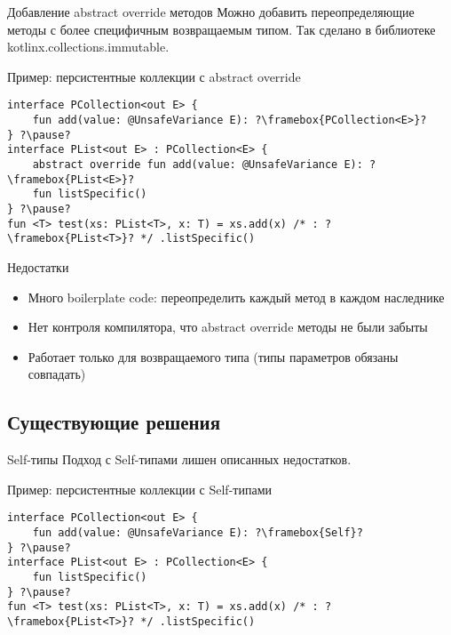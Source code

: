\documentclass[aspectratio=169,usenames,dvipsnames]{beamer}
\begin{document}
    \begin{frame}[fragile]{Добавление abstract override методов}
        Можно добавить переопределяющие методы с более специфичным возвращаемым типом.
        Так сделано в библиотеке kotlinx.collections.immutable.
        \pause
        \begin{block}{Пример: персистентные коллекции с abstract override}
            \begin{verbatim}
interface PCollection<out E> {
    fun add(value: @UnsafeVariance E): ?\framebox{PCollection<E>}?
} ?\pause?
interface PList<out E> : PCollection<E> {
    abstract override fun add(value: @UnsafeVariance E): ?\framebox{PList<E>}?
    fun listSpecific()
} ?\pause?
fun <T> test(xs: PList<T>, x: T) = xs.add(x) /* : ?\framebox{PList<T>}? */ .listSpecific()
            \end{verbatim}
        \end{block}
        \pause
        \begin{block}{Недостатки}
            \begin{itemize}
                \item Много boilerplate code: переопределить каждый метод в каждом наследнике
                \item Нет контроля компилятора, что abstract override методы не были забыты
                \item Работает только для возвращаемого типа (типы параметров обязаны совпадать)
            \end{itemize}
        \end{block}
    \end{frame}

    \subsection{Существующие решения}

    \begin{frame}[fragile]{Self-типы}
        Подход с Self-типами лишен описанных недостатков.
        \begin{block}{Пример: персистентные коллекции с Self-типами}
            \begin{verbatim}
interface PCollection<out E> {
    fun add(value: @UnsafeVariance E): ?\framebox{Self}?
} ?\pause?
interface PList<out E> : PCollection<E> {
    fun listSpecific()
} ?\pause?
fun <T> test(xs: PList<T>, x: T) = xs.add(x) /* : ?\framebox{PList<T>}? */ .listSpecific()
            \end{verbatim}
        \end{block}
    \end{frame}
\end{document}
